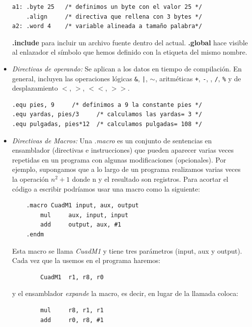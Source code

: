 \begin{itemize}
\begin{lstlisting}
a1: .byte 25   /* definimos un byte con el valor 25 */
    .align     /* directiva que rellena con 3 bytes */
a2: .word 4    /* variable alineada a tamaño palabra*/
\end{lstlisting}

        \textbf{.include} para incluir un archivo fuente dentro del actual.
        \textbf{.global} hace visible al enlazador el símbolo que hemos
        definido con la etiqueta del mismo nombre.

     \item \textit{Directivas de operando:} Se aplican a los datos en
        tiempo de compilación. En general, incluyen las operaciones lógicas
        {\tt \&}, {\tt |}, {\tt $\sim$}, aritméticas {\tt +}, {\tt -},
        {\tt *}, {\tt /}, {\tt \%} y de desplazamiento
        {\tt $<$}, {\tt $>$}, {\tt $<<$}, {\tt $>>$}.

\begin{lstlisting}
.equ pies, 9     /* definimos a 9 la constante pies */
.equ yardas, pies/3     /* calculamos las yardas= 3 */
.equ pulgadas, pies*12  /* calculamos pulgadas= 108 */
\end{lstlisting}

     \item \textit{Directivas de Macros:} Una {\it .macro} es un
conjunto de sentencias en ensamblador (directivas e instrucciones) que
pueden aparecer varias veces repetidas en un programa con algunas
modificaciones (opcionales). Por ejemplo, supongamos que a lo largo de
un programa realizamos varias veces la operación $n^{2}+1$ donde n y el
resultado son registros. Para acortar el código a escribir
podríamos usar una macro como la siguiente:

\begin{lstlisting}
    .macro CuadM1 input, aux, output
        mul     aux, input, input
        add     output, aux, #1
    .endm    
\end{lstlisting}

Esta macro se llama {\it CuadM1} y tiene tres parámetros (input, aux y output).
Cada vez que la usemos en el programa haremos:

\begin{lstlisting}
        CuadM1  r1, r8, r0
\end{lstlisting}

\noindent y el ensamblador {\it expande} la macro, es decir, en lugar de
la llamada coloca:

\begin{lstlisting}
        mul     r8, r1, r1
        add     r0, r8, #1
\end{lstlisting}


\end{itemize}
